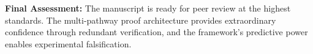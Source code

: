 \documentclass[12pt, a4paper]{article}
\theoremstyle{definition}
\theoremstyle{remark}
\begin{document}
\textbf{Final Assessment:} The manuscript is ready for peer review at the highest standards. The multi-pathway proof architecture provides extraordinary confidence through redundant verification, and the framework's predictive power enables experimental falsification.

\vspace{1cm}

\begin{center}
\end{center}
\end{document}
